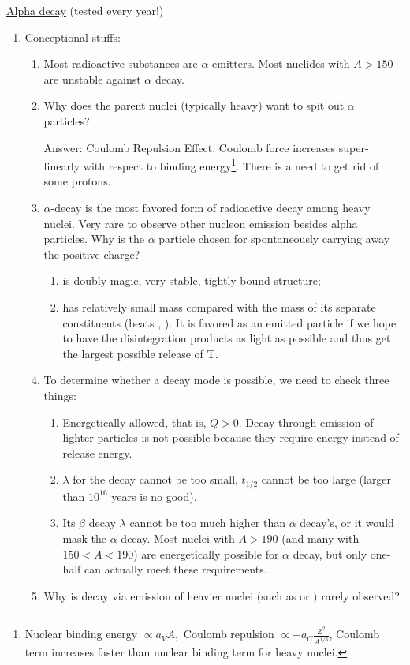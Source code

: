 \documentclass{school-22.101-notes}
\begin{document}
\clearpage
\uline{Alpha decay} (tested every year!)
\begin{enumerate}
\item Conceptional stuffs:
\begin{enumerate} 
\item Most radioactive substances are $\alpha$-emitters. Most nuclides with $A>150$ are unstable against $\alpha$ decay. 

\item Why does the parent nuclei (typically heavy) want to spit out $\alpha$ particles? 

Answer: Coulomb Repulsion Effect. Coulomb force increases super-linearly with respect to binding energy\footnote{Nuclear binding energy $\propto a_V A,$ Coulomb repulsion $\propto -a_C \frac{Z^2}{A^{1/3}}$, Coulomb term increases faster than nuclear binding term for heavy nuclei.}. There is a need to get rid of some protons.  
\item $\alpha$-decay is the most favored form of radioactive decay among heavy nuclei. Very rare to observe other nucleon emission besides alpha particles. Why is the $\alpha$ particle chosen for spontaneously carrying away the positive charge?
    \begin{enumerate}
    \item {} is doubly magic, very stable, tightly bound structure;
    \item {} has relatively small mass compared with the mass of its separate constituents (beats , ). It is favored as an emitted particle if we hope to have the disintegration products as light as possible and thus get the largest possible release of T. 
    \end{enumerate}
\item To determine whether a decay mode is possible, we need to check three things:
    \begin{enumerate}
    \item Energetically allowed, that is, $Q > 0$. Decay through emission of lighter particles is not possible because they require energy instead of release energy.
    \item $\lambda$ for the decay cannot be too small, $t_{1/2}$ cannot be too large (larger than $10^{16}$ years is no good). 
    \item Its $\beta$ decay $\lambda$ cannot be too much higher than $\alpha$ decay's, or it would mask the $\alpha$ decay. Most nuclei with $A>190$ (and many with $150 < A < 190$) are energetically possible for $\alpha$ decay, but only one-half can actually meet these requirements.
    \end{enumerate}
\item Why is decay via emission of heavier nuclei (such as  or ) rarely observed? 


\end{enumerate}
\end{enumerate}
\end{document}
